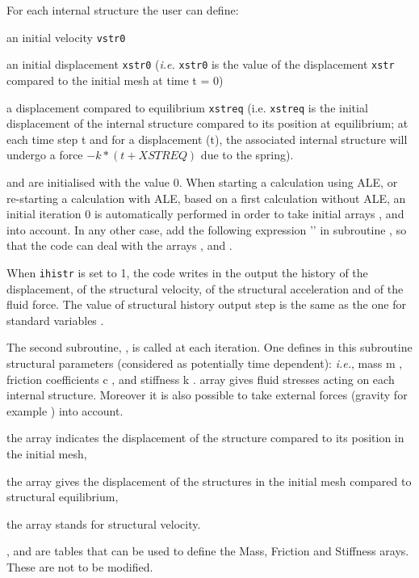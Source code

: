 {{For each internal structure the user can define:
\begin{list}{-}{}
 \item an initial velocity \texttt{vstr0}
 \item an initial displacement \texttt{xstr0} ({\em i.e.} \texttt{xstr0} is the value of the
 displacement \texttt{xstr} compared to the initial mesh at time t = 0)
 \item a displacement compared to equilibrium  \texttt{xstreq} (i.e. \texttt{xstreq}
 is the initial displacement of the internal structure compared to its position at
 equilibrium; at each time step t and for a displacement (t), the associated
 internal structure will undergo a force $-k*(\text{}t+XSTREQ)$ due to the spring).
\end{list}
 and  are initialised with the value 0.
When starting a calculation using ALE, or re-starting a calculation with ALE, based
 on a first calculation without ALE, an initial iteration 0 is automatically performed
 in order to take initial arrays ,  and  into
 account. In any other case, add the following expression '' in subroutine
 , so that the code can deal with the arrays ,  and .

When \texttt{ihistr} is set to 1, the code writes in the output the history of the
 displacement, of the structural velocity, of the structural acceleration and of the
 fluid force. The value of structural history output step is the same as the one for
 standard variables .

The second subroutine, , is called at each iteration. One defines in this
 subroutine structural parameters (considered as potentially time dependent): {\em i.e.},
 mass m , friction coefficients c , and stiffness k .
  array gives fluid stresses acting on each internal structure. Moreover it is also
 possible to take external forces (gravity for example ) into account.
\begin{list}{.}{}
 \item the  array indicates the displacement of the structure compared to its position in the initial mesh,
 \item the  array gives the displacement of the structures in the initial mesh
 compared to structural equilibrium,
 \item the  array stands for structural velocity.
\end{list}
,  and  are  tables that can be used to
 define the  Mass, Friction and Stiffness arays. These are not to be modified.

}}
